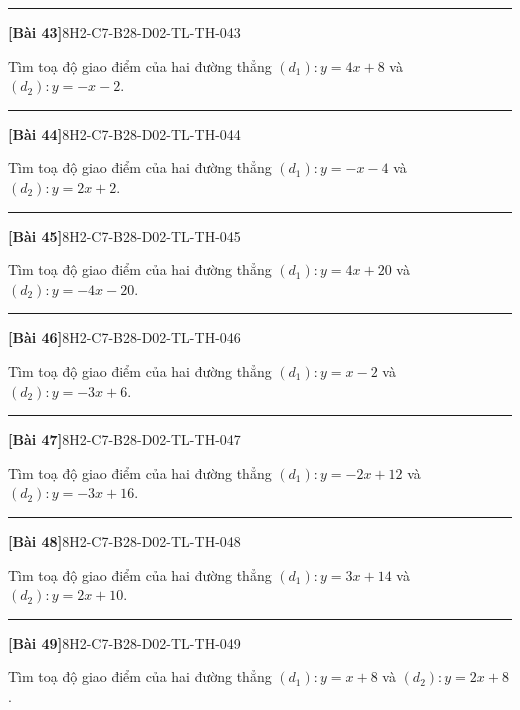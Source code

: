 \documentclass[12pt,a4paper]{article}
\newif\ifloigiai
\newenvironment{cauhoi}[2]{%
  \par\medskip\noindent\rule{\textwidth}{0.4pt}\par\nopagebreak
  \noindent\textbf{[#1]}\hfill{\scriptsize\ttfamily #2}\par\nopagebreak\smallskip}{\par}
\newcommand{\loigiai}[1]{\ifloigiai\par\smallskip\noindent\textit{Lời giải.} #1\par\fi}
\begin{document}
\begin{cauhoi}{Bài 43}{8H2-C7-B28-D02-TL-TH-043}
Tìm toạ độ giao điểm của hai đường thẳng $(d_1): y=4x+8$ và $(d_2): y=-x-2$.
\loigiai{Hoành độ giao điểm là nghiệm của phương trình $4x+8=-x-2$, suy ra $5x=-10$ nên $x=-2$. Thay vào $(d_1)$: $y=4\cdot(-2)+8=0$. Vậy giao điểm là $(-2;0)$.}
\end{cauhoi}
\begin{cauhoi}{Bài 44}{8H2-C7-B28-D02-TL-TH-044}
Tìm toạ độ giao điểm của hai đường thẳng $(d_1): y=-x-4$ và $(d_2): y=2x+2$.
\loigiai{Hoành độ giao điểm là nghiệm của phương trình $-x-4=2x+2$, suy ra $-3x=6$ nên $x=-2$. Thay vào $(d_1)$: $y=-1\cdot(-2)-4=-2$. Vậy giao điểm là $(-2;-2)$.}
\end{cauhoi}
\begin{cauhoi}{Bài 45}{8H2-C7-B28-D02-TL-TH-045}
Tìm toạ độ giao điểm của hai đường thẳng $(d_1): y=4x+20$ và $(d_2): y=-4x-20$.
\loigiai{Hoành độ giao điểm là nghiệm của phương trình $4x+20=-4x-20$, suy ra $8x=-40$ nên $x=-5$. Thay vào $(d_1)$: $y=4\cdot(-5)+20=0$. Vậy giao điểm là $(-5;0)$.}
\end{cauhoi}
\begin{cauhoi}{Bài 46}{8H2-C7-B28-D02-TL-TH-046}
Tìm toạ độ giao điểm của hai đường thẳng $(d_1): y=x-2$ và $(d_2): y=-3x+6$.
\loigiai{Hoành độ giao điểm là nghiệm của phương trình $x-2=-3x+6$, suy ra $4x=8$ nên $x=2$. Thay vào $(d_1)$: $y=1\cdot(2)-2=0$. Vậy giao điểm là $(2;0)$.}
\end{cauhoi}
\begin{cauhoi}{Bài 47}{8H2-C7-B28-D02-TL-TH-047}
Tìm toạ độ giao điểm của hai đường thẳng $(d_1): y=-2x+12$ và $(d_2): y=-3x+16$.
\loigiai{Hoành độ giao điểm là nghiệm của phương trình $-2x+12=-3x+16$, suy ra $x=4$ nên $x=4$. Thay vào $(d_1)$: $y=-2\cdot(4)+12=4$. Vậy giao điểm là $(4;4)$.}
\end{cauhoi}
\begin{cauhoi}{Bài 48}{8H2-C7-B28-D02-TL-TH-048}
Tìm toạ độ giao điểm của hai đường thẳng $(d_1): y=3x+14$ và $(d_2): y=2x+10$.
\loigiai{Hoành độ giao điểm là nghiệm của phương trình $3x+14=2x+10$, suy ra $x=-4$ nên $x=-4$. Thay vào $(d_1)$: $y=3\cdot(-4)+14=2$. Vậy giao điểm là $(-4;2)$.}
\end{cauhoi}
\begin{cauhoi}{Bài 49}{8H2-C7-B28-D02-TL-TH-049}
Tìm toạ độ giao điểm của hai đường thẳng $(d_1): y=x+8$ và $(d_2): y=2x+8$.
\loigiai{Hoành độ giao điểm là nghiệm của phương trình $x+8=2x+8$, suy ra $-x=0$ nên $x=0$. Thay vào $(d_1)$: $y=1\cdot(0)+8=8$. Vậy giao điểm là $(0;8)$.}
\end{cauhoi}
\end{document}
